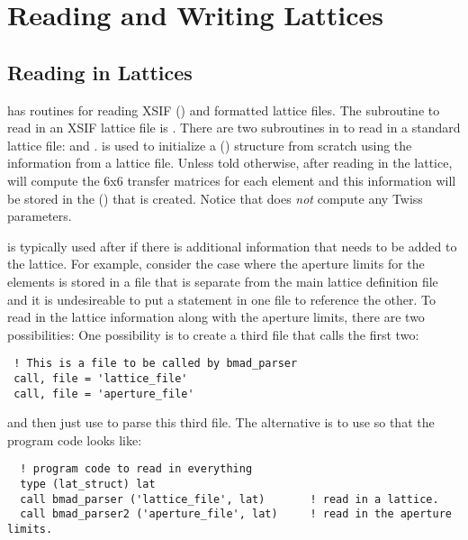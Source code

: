 \chapter{Reading and Writing Lattices}

\section{Reading in Lattices}
\label{s:lat.readin}


\bmad has routines for reading XSIF () and
\bmad formatted lattice files. The subroutine to read in an XSIF lattice
file is . There are two subroutines in \bmad to read
in a \bmad standard lattice file:  and
.  is used to initialize a
 () 
structure from scratch using the information from a
lattice file. Unless told otherwise, after reading in the lattice,
 will compute the 6x6 transfer matrices for each element
and this information will be stored in the 
() that is created.  Notice that 
does {\em not} compute any Twiss parameters.

 is typically used after  if there is
additional information that needs to be added to the lattice. For
example, consider the case where the aperture limits for the elements 
is stored in a file that is separate from the main lattice definition
file and it is undesireable to put a  statement in one file
to reference the other.
To read in the lattice information along with the aperture limits, 
there are two possibilities: One possibility 
is to create a third file that calls the first two:
\begin{verbatim}
 ! This is a file to be called by bmad_parser
 call, file = 'lattice_file'
 call, file = 'aperture_file'
\end{verbatim}
and then just use  to parse this third file. The
alternative is to use  so that the program code looks
like:
\begin{verbatim}
  ! program code to read in everything
  type (lat_struct) lat
  call bmad_parser ('lattice_file', lat)       ! read in a lattice.
  call bmad_parser2 ('aperture_file', lat)     ! read in the aperture limits.
\end{verbatim}

